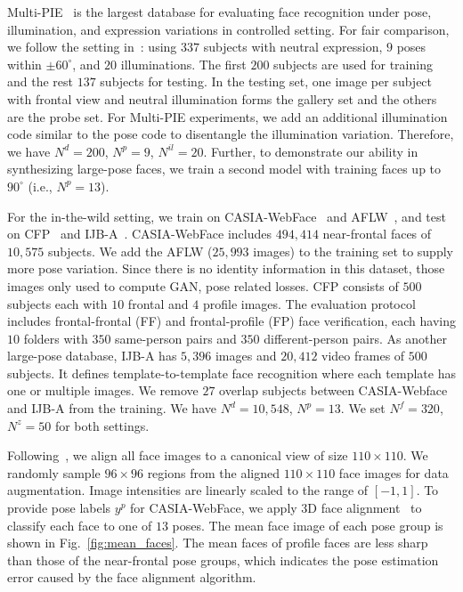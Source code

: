 \documentclass[10pt,journal,compsoc]{IEEEtran}
\begin{document}
\label{sec:dataset}
Multi-PIE~\cite{gross2010multi} is the largest database for evaluating face recognition under pose, illumination, and expression variations in controlled setting. 
For fair comparison, we follow the setting in~\cite{zhu2014multi}: using $337$ subjects with neutral expression, $9$ poses within $\pm60^\circ$, and $20$ illuminations. 
The first $200$ subjects are used for training and the rest $137$ subjects for testing. 
In the testing set, one image per subject with frontal view and neutral illumination forms the gallery set and the others are the probe set. 
For Multi-PIE experiments, we add an additional illumination code similar to the pose code to disentangle the illumination variation. 
Therefore, we have $N^d=200$, $N^p=9$, $N^{il}=20$.
Further, to demonstrate our ability in synthesizing large-pose faces, we train a second model with training faces up to $90^\circ$ (i.e., $N^p=13$).

For the in-the-wild setting, we train on CASIA-WebFace~\cite{yi2014learning} and AFLW~\cite{koestinger2011annotated}, and test on CFP~\cite{sengupta2016frontal} and IJB-A~\cite{klare2015pushing}.  
CASIA-WebFace includes $494,414$ near-frontal faces of $10,575$ subjects. 
We add the AFLW ($25,993$ images) to the training set to supply more pose variation. Since there is no identity information in this dataset, those images only used to compute GAN, pose related losses.
CFP consists of $500$ subjects each with $10$ frontal and $4$ profile images. 
The evaluation protocol includes frontal-frontal (FF) and frontal-profile (FP) face verification, each having $10$ folders with $350$ same-person pairs and $350$ different-person pairs.
As another large-pose database, IJB-A has $5,396$ images and $20,412$ video frames of $500$ subjects. 
It defines template-to-template face recognition where each template has one or multiple images. 
We remove $27$ overlap subjects between CASIA-Webface and IJB-A  from the training.
We have $N^d=10,548$, $N^p=13$. 
We set $N^{f}=320$, $N^{z}=50$ for both settings.

Following~\cite{yi2014learning}, we align all face images to a canonical view of size $110\times110$.
We randomly sample $96\times 96$ regions from the aligned $110\times 110$ face images for data augmentation. 
Image intensities are linearly scaled to the range of $[-1, 1]$. 
To provide pose labels $y^p$ for CASIA-WebFace, we apply $3$D face alignment~\cite{jourabloo2017pose,jourabloo2017pose-ijcv} to classify each face to one of $13$ poses. 
The mean face image of each pose group is shown in Fig.~\ref{fig:mean_faces}.
The mean faces of profile faces are less sharp than those of the near-frontal pose groups, which indicates the pose estimation error caused by the face alignment algorithm. 
\end{document}
